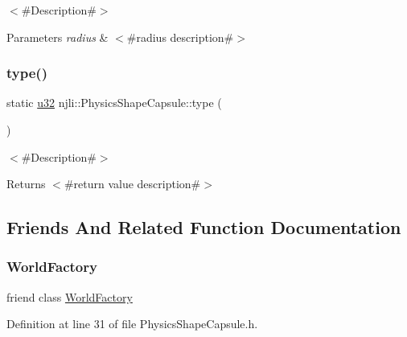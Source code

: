 $<$\#\+Description\#$>$


\begin{DoxyParams}{Parameters}
{\em radius} & $<$\#radius description\#$>$ \\
\hline
\end{DoxyParams}
\mbox{\label{classnjli_1_1_physics_shape_capsule_a8d41dedd4e23513219a6f598b1a7007b}} 
\subsubsection{\texorpdfstring{type()}{type()}}
{\footnotesize\ttfamily static \mbox{\hyperlink{_util_8h_a10e94b422ef0c20dcdec20d31a1f5049}{u32}} njli\+::\+Physics\+Shape\+Capsule\+::type (\begin{DoxyParamCaption}{ }\end{DoxyParamCaption})\hspace{0.3cm}{\ttfamily [static]}}

$<$\#\+Description\#$>$

\begin{DoxyReturn}{Returns}
$<$\#return value description\#$>$ 
\end{DoxyReturn}


\subsection{Friends And Related Function Documentation}
\mbox{\label{classnjli_1_1_physics_shape_capsule_acb96ebb09abe8f2a37a915a842babfac}} 
\subsubsection{\texorpdfstring{World\+Factory}{WorldFactory}}
{\footnotesize\ttfamily friend class \mbox{\hyperlink{classnjli_1_1_world_factory}{World\+Factory}}\hspace{0.3cm}{\ttfamily [friend]}}



Definition at line 31 of file Physics\+Shape\+Capsule.\+h.



